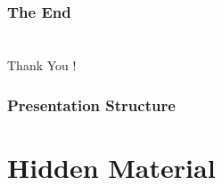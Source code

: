 \documentclass[11pt]{beamer}
\begin{document}
\begin{frame}
  \frametitle{\normalsize{\textbf{The End}}}

  \section{}
  \begin{center}
    \huge{Thank You !}
  \end{center}

\end{frame}

\appendix

\begin{frame}
  \frametitle{\normalsize{\textbf{
        Presentation Structure
  }}}

  \section{Hidden Material}
  \tableofcontents[currentsection] 
  
\end{frame}
\end{document}
